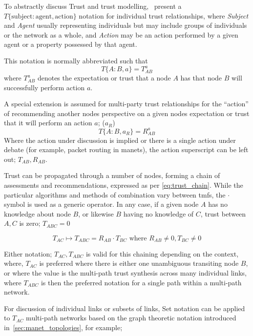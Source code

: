 To abstractly discuss Trust and trust modelling,~\citet{Liu2006} present a $T\{\text{subject}:\text{agent},\text{action}\}$ notation for individual trust relationships, where \emph{Subject} and \emph{Agent} usually representing individuals but may include groups of individuals or the network as a whole, and \emph{Action} may be an action performed by a given agent or a property possessed by that agent.

This notation is normally abbreviated such that 
\begin{equation}
  \label{eq:trust_notation}
  T\{A:B,a\} = T^a_{AB}
\end{equation} 
where $T^a_{AB}$ denotes the expectation or trust that a node $A$ has that node $B$ will successfully perform action $a$.

A special extension is assumed for multi-party trust relationships for the ``action'' of recommending another nodes perspective on a given nodes expectation or trust that it will perform an action $a$; ($a_R$)
%
\begin{equation}
  \label{eq:recommendation_notation}
  T\{A:B,a_R\} = R^a_{AB}
\end{equation}
%
Where the action under discussion is implied or there is a single action under debate (for example, packet routing in \glspl{manet}), the action superscript can be left out; $T_{AB} , R_{AB}$.

Trust can be propagated through a number of nodes, forming a chain of assessments and recommendations, expressed as per \eqref{eq:trust_chain}.
While the particular algorithms and methods of combination vary between \glspl{tmf}, the $\cdot$ symbol is used as a generic operator.
In any case, if a given node $A$ has no knowledge about node $B$, or likewise $B$ having no knowledge of $C$, trust between $A,C$ is zero; $T_{ABC} = 0$

\begin{equation}
	\label{eq:trust_chain}
	T_ {AC}\mapsto T_{ABC} = R_{AB} \cdot T_{BC} \text{ where } R_{AB} \neq 0 , T_{BC} \neq 0
\end{equation}

Either notation; $T_{AC}, T_{ABC}$ is valid for this chaining depending on the context, where, $T_{AC}$ is preferred where there is either one unambiguous transiting node $B$, or where the value is the multi-path trust synthesis across many individual links, where $T_{ABC}$ is then the preferred notation for a single path within a multi-path network.

For discussion of individual links or subsets of links, Set notation can be applied to $T_{AC}$ multi-path networks based on the graph theoretic notation introduced in~\autoref{sec:manet_topologies}, for example;

